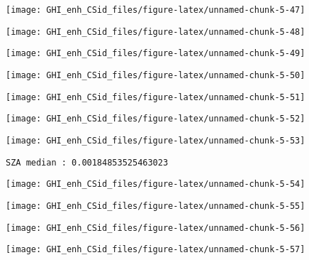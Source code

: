 \documentclass[
  10pt,
  a4paper,oneside]{article}
\begin{document}
\begin{center}\texttt{[image: GHI\_enh\_CSid\_files/figure-latex/unnamed-chunk-5-47]} \end{center}

\begin{center}\texttt{[image: GHI\_enh\_CSid\_files/figure-latex/unnamed-chunk-5-48]} \end{center}

\begin{center}\texttt{[image: GHI\_enh\_CSid\_files/figure-latex/unnamed-chunk-5-49]} \end{center}

\begin{center}\texttt{[image: GHI\_enh\_CSid\_files/figure-latex/unnamed-chunk-5-50]} \end{center}

\begin{center}\texttt{[image: GHI\_enh\_CSid\_files/figure-latex/unnamed-chunk-5-51]} \end{center}

\begin{center}\texttt{[image: GHI\_enh\_CSid\_files/figure-latex/unnamed-chunk-5-52]} \end{center}

\begin{center}\texttt{[image: GHI\_enh\_CSid\_files/figure-latex/unnamed-chunk-5-53]} \end{center}

\begin{verbatim}
SZA median : 0.00184853525463023 
\end{verbatim}

\begin{center}\texttt{[image: GHI\_enh\_CSid\_files/figure-latex/unnamed-chunk-5-54]} \end{center}

\begin{center}\texttt{[image: GHI\_enh\_CSid\_files/figure-latex/unnamed-chunk-5-55]} \end{center}

\begin{center}\texttt{[image: GHI\_enh\_CSid\_files/figure-latex/unnamed-chunk-5-56]} \end{center}

\begin{center}\texttt{[image: GHI\_enh\_CSid\_files/figure-latex/unnamed-chunk-5-57]} \end{center}
\end{document}
